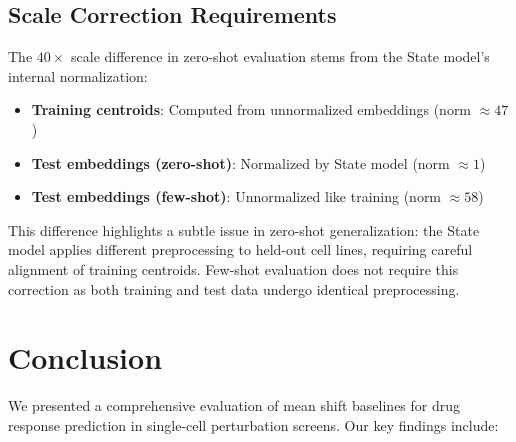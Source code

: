 \documentclass[conference]{IEEEtran}
\begin{document}
\subsection{Scale Correction Requirements}

The $40\times$ scale difference in zero-shot evaluation stems from the State model's internal normalization:
\begin{itemize}
    \item \textbf{Training centroids}: Computed from unnormalized embeddings (norm $\approx 47$)
    \item \textbf{Test embeddings (zero-shot)}: Normalized by State model (norm $\approx 1$)
    \item \textbf{Test embeddings (few-shot)}: Unnormalized like training (norm $\approx 58$)
\end{itemize}

This difference highlights a subtle issue in zero-shot generalization: the State model applies different preprocessing to held-out cell lines, requiring careful alignment of training centroids. Few-shot evaluation does not require this correction as both training and test data undergo identical preprocessing.

\section{Conclusion}

We presented a comprehensive evaluation of mean shift baselines for drug response prediction in single-cell perturbation screens. Our key findings include:
\end{document}
